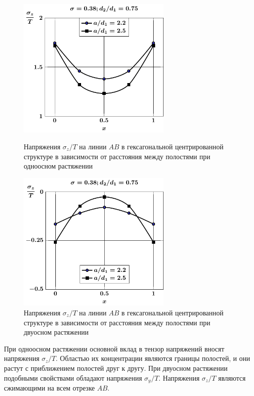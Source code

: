 \begin{figure}[h!]
\centering\footnotesize
\parbox[b]{7.5cm}{\centering\includegraphics[width=7.5cm]{cav13-a-d75-t1-sig_z.pdf}
\caption{Напряжения $\sigma_z/T$ на линии $AB$ в гексагональной центрированной структуре в зависимости от расстояния между полостями при одноосном растяжении 
\label{f:9:48}}}\hfil\hfil
\parbox[b]{7.5cm}{\centering\includegraphics[width=7.5cm]{cav13-a-d75-t2-sig_z.pdf}
\caption{Напряжения $\sigma_z/T$ на линии $AB$ в гексагональной центрированной структуре в зависимости от расстояния между полостями при двуосном растяжении
\label{f:9:49}}}
\end{figure}

При одноосном растяжении основной вклад в тензор напряжений вносят напряжения $\sigma_z/T$. Областью их концентрации являются границы полостей, и они растут с приближением полостей друг к другу. При двуосном растяжении подобными свойствами обладают напряжения $\sigma_y/T$. Напряжения $\sigma_z/T$ являются сжимающими на всем отрезке $AB$.

